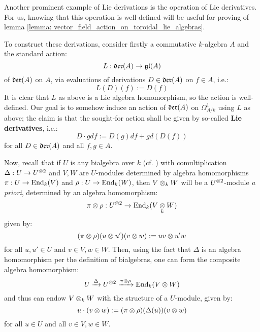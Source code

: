         \begin{example} \label{example: lie_derivatives}
            Another prominent example of Lie derivations is the operation of Lie derivatives. For us, knowing that this operation is well-defined will be useful for proving of lemma \ref{lemma: vector_field_action_on_toroidal_lie_algebras}. 

            To construct these derivations, consider firstly a commutative $k$-algebra $A$ and the standard action:
                $$L: \mathfrak{der}(A) \to \mathfrak{gl}(A)$$
            of $\mathfrak{der}(A)$ on $A$, via evaluations of derivations $D \in \mathfrak{der}(A)$ on  $f \in A$, i.e.:
                $$L(D)(f) := D(f)$$
            It is clear that $L$ as above is a Lie algebra homomorphism, so the action is well-defined. Our goal is to somehow induce an action of $\mathfrak{der}(A)$ on $\Omega^1_{A/k}$ using $L$ as above; the claim is that the sought-for action shall be given by so-called \textbf{Lie derivatives}, i.e.:
                $$D \cdot g df := D(g) df + g d(D(f))$$
            for all $D \in \mathfrak{der}(A)$ and all $f, g \in A$.

            Now, recall that if $U$ is any bialgebra over $k$ (cf. \cite[Section III.2]{kassel_quantum_groups}) with comultiplication $\Delta: U \to U^{\tensor 2}$ and $V, W$ are $U$-modules determined by algebra homomorphisms $\pi: U \to \mathrm{End}_k(V)$ and $\rho: U \to \mathrm{End}_k(W)$, then $V \tensor_k W$ will be a $U^{\tensor 2}$-module \textit{a priori}, determined by an algebra homomorphism:
                $$\pi \tensor \rho: U^{\tensor 2} \to \End_k(V \tensor_k W)$$
            given by:
                $$(\pi \tensor \rho)(u \tensor u')(v \tensor w) := uv \tensor u' w$$
            for all $u, u' \in U$ and $v \in V, w \in W$. Then, using the fact that $\Delta$ is an algebra homomorphism per the definition of bialgebras, one can form the composite algebra homomorphism:
                $$U \xrightarrow[]{\Delta} U^{\tensor 2} \xrightarrow[]{\pi \tensor \rho} \End_k(V \tensor W)$$
            and thus can endow $V \tensor_k W$ with the structure of a $U$-module, given by:
                $$u \cdot (v \tensor w) := (\pi \tensor \rho)(\Delta(u))( v \tensor w )$$
            for all $u \in U$ and all $v \in V, w \in W$.
            

\end{example}
